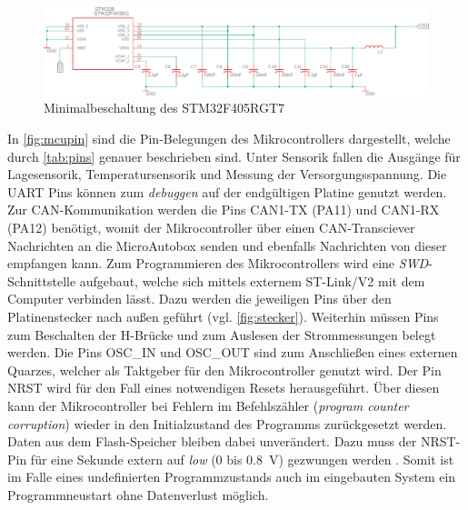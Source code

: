 \begin{figure}[H]%
\centering
\includegraphics[width=\columnwidth]{./Bilder/MCU_MIN.pdf}%
\caption{Minimalbeschaltung des STM32F405RGT7}%
\label{fig:mcumin}%
\end{figure}\noindent
In \autoref{fig:mcupin} sind die Pin-Belegungen des Mikrocontrollers dargestellt, welche durch \autoref{tab:pins} genauer beschrieben sind. Unter Sensorik fallen die Ausgänge für Lagesensorik, Temperatursensorik und Messung der Versorgungsspannung. Die UART Pins können zum \textit{debuggen} auf der endgültigen Platine genutzt werden. Zur CAN-Kommunikation werden die Pins CAN1-TX (PA11) und CAN1-RX (PA12) benötigt, womit der Mikrocontroller über einen CAN-Transciever Nachrichten an die MicroAutobox senden und ebenfalls Nachrichten von dieser empfangen kann. Zum Programmieren des Mikrocontrollers wird eine \textit{SWD}-Schnittstelle aufgebaut, welche sich mittels externem ST-Link/V2 mit dem Computer verbinden lässt. Dazu werden die jeweiligen Pins über den Platinenstecker nach außen geführt (vgl. \autoref{fig:stecker}). Weiterhin müssen Pins zum Beschalten der H-Brücke und zum Auslesen der Strommessungen belegt werden. Die Pins OSC\_IN und OSC\_OUT sind zum Anschließen eines externen Quarzes, welcher als Taktgeber für den Mikrocontroller genutzt wird. Der Pin NRST wird für den Fall eines notwendigen Resets herausgeführt. Über diesen kann der Mikrocontroller bei Fehlern im Befehlszähler (\textit{program counter corruption}) wieder in den Initialzustand des Programms zurückgesetzt werden. Daten aus dem Flash-Speicher bleiben dabei unverändert. Dazu muss der NRST-Pin für eine Sekunde extern auf \textit{low} (0 bis \SI{0,8}{V}) gezwungen werden \cite[S. 111]{stm32}. Somit ist im Falle eines undefinierten Programmzustands auch im eingebauten System ein Programmneustart ohne Datenverlust möglich.

